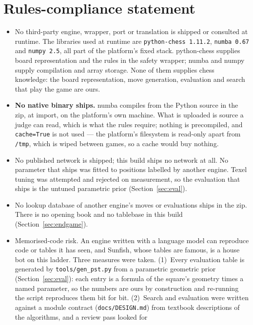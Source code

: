 \documentclass[11pt,a4paper]{article}
\newcommand{\code}[1]{\texttt{#1}}
\begin{document}
\section{Rules-compliance statement}\label{sec:rules}
\begin{itemize}[nosep]
  \item No third-party engine, wrapper, port or translation is shipped or consulted at runtime. The
        libraries used at runtime are \code{python-chess 1.11.2}, \code{numba 0.67} and \code{numpy 2.5},
        all part of the platform's fixed stack. python-chess supplies board representation and the rules
        in the safety wrapper; numba and numpy supply compilation and array storage. None of them supplies
        chess knowledge: the board representation, move generation, evaluation and search that play the
        game are ours.
  \item \textbf{No native binary ships.} numba compiles from the Python source in the zip, at import, on
        the platform's own machine. What is uploaded is source a judge can read, which is what the rules
        require; nothing is precompiled, and \code{cache=True} is not used --- the platform's filesystem is
        read-only apart from \code{/tmp}, which is wiped between games, so a cache would buy nothing.
  \item No published network is shipped; this build ships no network at all. No parameter that ships was
        fitted to positions labelled by another engine. Texel tuning was attempted and rejected on
        measurement, so the evaluation that ships is the untuned parametric prior
        (Section~\ref{sec:eval}).
  \item No lookup database of another engine's moves or evaluations ships in the zip. There is no opening
        book and no tablebase in this build (Section~\ref{sec:endgame}).
  \item Memorised-code risk. An engine written with a language model can reproduce code or tables it has
        seen, and Sunfish, whose tables are famous, is a house bot on this ladder. Three measures were
        taken. (1)~Every evaluation table is generated by \code{tools/gen\_pst.py} from a parametric
        geometric prior (Section~\ref{sec:eval}): each entry is a formula of the square's geometry times a
        named parameter, so the numbers are ours by construction and re-running the script reproduces
        them bit for bit. (2)~Search and evaluation were written against a module contract
        (\code{docs/DESIGN.md}) from textbook descriptions of the algorithms, and a review pass looked for

\end{itemize}
\end{document}
